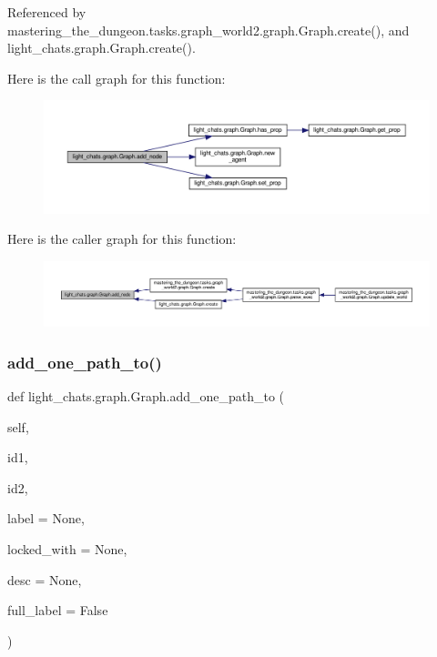 Referenced by mastering\+\_\+the\+\_\+dungeon.\+tasks.\+graph\+\_\+world2.\+graph.\+Graph.\+create(), and light\+\_\+chats.\+graph.\+Graph.\+create().

Here is the call graph for this function\+:
\nopagebreak
\begin{figure}[H]
\begin{center}
\leavevmode
\includegraphics[width=350pt]{classlight__chats_1_1graph_1_1Graph_a5356cdaf2e48b3a128773c70957cb38a_cgraph}
\end{center}
\end{figure}
Here is the caller graph for this function\+:
\nopagebreak
\begin{figure}[H]
\begin{center}
\leavevmode
\includegraphics[width=350pt]{classlight__chats_1_1graph_1_1Graph_a5356cdaf2e48b3a128773c70957cb38a_icgraph}
\end{center}
\end{figure}
\mbox{\label{classlight__chats_1_1graph_1_1Graph_ae7da5d306e949414cc4df9d49bc0678d}} 
\subsubsection{\texorpdfstring{add\+\_\+one\+\_\+path\+\_\+to()}{add\_one\_path\_to()}}
{\footnotesize\ttfamily def light\+\_\+chats.\+graph.\+Graph.\+add\+\_\+one\+\_\+path\+\_\+to (\begin{DoxyParamCaption}\item[{}]{self,  }\item[{}]{id1,  }\item[{}]{id2,  }\item[{}]{label = {\ttfamily None},  }\item[{}]{locked\+\_\+with = {\ttfamily None},  }\item[{}]{desc = {\ttfamily None},  }\item[{}]{full\+\_\+label = {\ttfamily False} }\end{DoxyParamCaption})}



